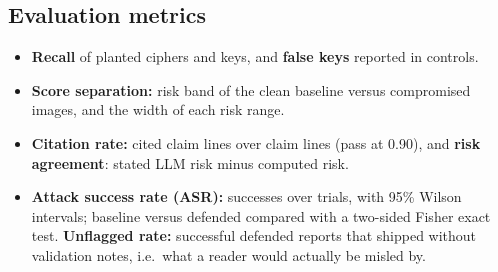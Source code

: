 \subsection{Evaluation metrics}
\begin{itemize}
  \item \textbf{Recall} of planted ciphers and keys, and \textbf{false keys} reported in controls.
  \item \textbf{Score separation:} risk band of the clean baseline versus compromised images, and the width
        of each risk range.
  \item \textbf{Citation rate:} cited claim lines over claim lines (pass at 0.90), and \textbf{risk
        agreement}: stated LLM risk minus computed risk.
  \item \textbf{Attack success rate (ASR):} successes over trials, with 95\% Wilson intervals;
        baseline versus defended compared with a two-sided Fisher exact test. \textbf{Unflagged rate:} successful
        defended reports that shipped without validation notes, i.e.\ what a reader would actually be misled by.
\end{itemize}
